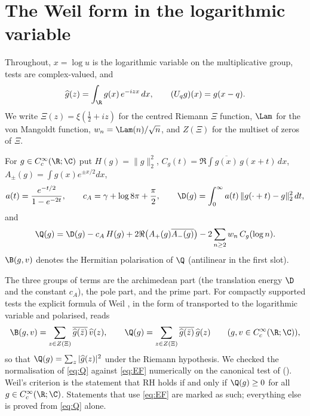 \section{The Weil form in the logarithmic variable}\label{sec:setup}

Throughout, $x=\log u$ is the logarithmic variable on the multiplicative group, tests are complex-valued, and
\[
 \widehat g(z)=\int_{\R} g(x)\,e^{-izx}\,dx,\qquad (U_qg)(x)=g(x-q).
\]
We write $\Xi(z)=\xi(\tfrac12+iz)$ for the centred Riemann $\Xi$ function, $\Lam$ for the von Mangoldt function,
$w_n=\Lam(n)/\sqrt n$, and $Z(\Xi)$ for the multiset of zeros of $\Xi$.

\begin{definition}\label{def:Q}
For $g\in C_c^\infty(\R;\C)$ put $H(g)=\|g\|_2^2$, $C_g(t)=\Re\int\overline{g(x)}\,g(x+t)\,dx$, $A_\pm(g)=\int g(x)e^{\pm x/2}dx$,
\[
 a(t)=\frac{e^{-t/2}}{1-e^{-2t}},\qquad c_A=\gamma+\log 8\pi+\frac{\pi}{2},\qquad
 \D(g)=\int_0^\infty a(t)\,\|g(\cdot+t)-g\|_2^2\,dt ,
\]
and
\begin{equation}\label{eq:Q}
 \Q(g)=\D(g)-c_A\,H(g)+2\Re\bigl(A_+(g)\overline{A_-(g)}\bigr)-2\sum_{n\ge2}w_n\,C_g(\log n).
\end{equation}
$\B(g,v)$ denotes the Hermitian polarisation of $\Q$ (antilinear in the first slot).
\end{definition}

The three groups of terms are the archimedean part (the translation energy $\D$ and the constant $c_A$), the pole
part, and the prime part. For compactly supported tests the explicit formula of Weil \cite{Weil1952}, in the form of
\cite[\S2]{BOMBIERI-WEILQF-2000} transported to the logarithmic variable and polarised, reads
\begin{equation}\label{eq:EF}
 \B(g,v)=\sum_{z\in Z(\Xi)}\overline{\widehat g(\bar z)}\,\widehat v(z),\qquad
 \Q(g)=\sum_{z\in Z(\Xi)}\overline{\widehat g(\bar z)}\,\widehat g(z)\qquad(g,v\in C_c^\infty(\R;\C)),
\end{equation}
so that $\Q(g)=\sum_z|\widehat g(z)|^2$ under the Riemann hypothesis. We checked the normalisation of \eqref{eq:Q}
against \eqref{eq:EF} numerically on the canonical test of  (). Weil's criterion
\cite{Weil1952,BOMBIERI-WEILQF-2000} is the statement that RH holds if and only if $\Q(g)\ge0$ for all
$g\in C_c^\infty(\R;\C)$. Statements that use \eqref{eq:EF} are marked as such; everything else is proved from \eqref{eq:Q} alone.

